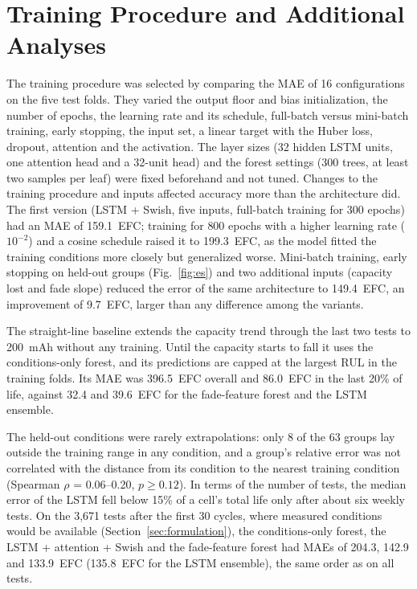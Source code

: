 \documentclass[conference]{IEEEtran}
\begin{document}
\clearpage
\section{Training Procedure and Additional Analyses}
\label{app:training}
The training procedure was selected by comparing the MAE of 16 configurations on the five test folds. They varied the output floor and bias initialization, the number of epochs, the learning rate and its schedule, full-batch versus mini-batch training, early stopping, the input set, a linear target with the Huber loss, dropout, attention and the activation. The layer sizes (32 hidden LSTM units, one attention head and a 32-unit head) and the forest settings (300 trees, at least two samples per leaf) were fixed beforehand and not tuned. Changes to the training procedure and inputs affected accuracy more than the architecture did. The first version (LSTM + Swish, five inputs, full-batch training for 300 epochs) had an MAE of 159.1~EFC; training for 800 epochs with a higher learning rate ($10^{-2}$) and a cosine schedule raised it to 199.3~EFC, as the model fitted the training conditions more closely but generalized worse. Mini-batch training, early stopping on held-out groups (Fig.~\ref{fig:es}) and two additional inputs (capacity lost and fade slope) reduced the error of the same architecture to 149.4~EFC, an improvement of 9.7~EFC, larger than any difference among the variants.

The straight-line baseline extends the capacity trend through the last two tests to 200~mAh without any training. Until the capacity starts to fall it uses the conditions-only forest, and its predictions are capped at the largest RUL in the training folds. Its MAE was 396.5~EFC overall and 86.0~EFC in the last 20\% of life, against 32.4 and 39.6~EFC for the fade-feature forest and the LSTM ensemble.

The held-out conditions were rarely extrapolations: only 8 of the 63 groups lay outside the training range in any condition, and a group's relative error was not correlated with the distance from its condition to the nearest training condition (Spearman $\rho$ = 0.06--0.20, $p \ge 0.12$). In terms of the number of tests, the median error of the LSTM fell below 15\% of a cell's total life only after about six weekly tests. On the 3,671 tests after the first 30 cycles, where measured conditions would be available (Section~\ref{sec:formulation}), the conditions-only forest, the LSTM + attention + Swish and the fade-feature forest had MAEs of 204.3, 142.9 and 133.9~EFC (135.8~EFC for the LSTM ensemble), the same order as on all tests.
\end{document}

